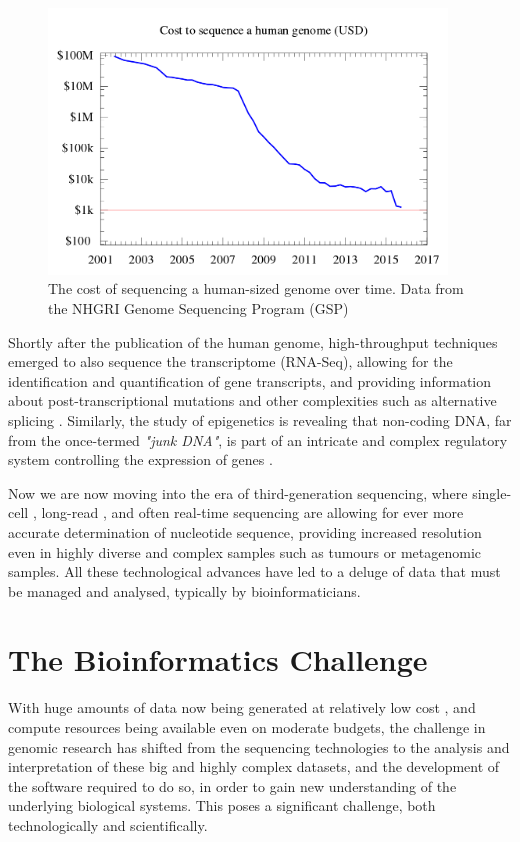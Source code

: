 \begin{figure}[h!]
    \centering
    \includegraphics[width=300pt]{chapters/images/Historic_cost_of_sequencing_a_human_genome.png}
    \caption{The cost of sequencing a human-sized genome over time. Data from the NHGRI Genome Sequencing Program (GSP) }
    \label{fig:seqcost}
\end{figure}

Shortly after the publication of the human genome, high-throughput techniques emerged to also sequence the transcriptome (RNA-Seq), allowing for the identification and quantification of gene transcripts, and providing information about post-transcriptional mutations and other complexities such as alternative splicing \cite{wang2009rna}. Similarly, the study of epigenetics is revealing that non-coding DNA, far from the once-termed \textit{"junk DNA"}, is part of an intricate and complex regulatory system controlling the expression of genes \cite{zuckerkandl2007combinatorial}.

Now we are now moving into the era of third-generation sequencing, where single-cell \cite{gawad2016single}, long-read \cite{koren2015one}, and often real-time sequencing \cite{flusberg2010direct} are allowing for ever more accurate determination of nucleotide sequence, providing increased resolution even in highly diverse and complex samples such as tumours or metagenomic samples. All these technological advances have led to a deluge of data that must be managed and analysed, typically by bioinformaticians.


\section{The Bioinformatics Challenge}

With huge amounts of data now being generated at relatively low cost \cite{chen2014big}, and compute resources being available even on moderate budgets, the challenge in genomic research has shifted from the sequencing technologies to the analysis and interpretation of these big and highly complex datasets, and the development of the software required to do so, in order to gain new understanding of the underlying biological systems. This poses a significant challenge, both technologically and scientifically.

